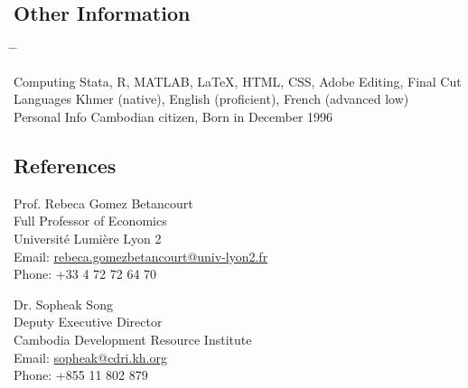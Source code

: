 \documentclass[10pt,a4paper]{article}
\newcommand{\tabbedblock}[1]{

	\begin{tabbing}
		\hspace{3cm} \= \hspace{4cm} \= \kill
		#1
	\end{tabbing}
}
\begin{document}
\subsection*{Other Information}

\tabbedblock{
	Computing \> Stata, R, MATLAB, \LaTeX, HTML, CSS,  Adobe Editing, Final Cut\\
	
	Languages \> Khmer (native), English (proficient), French (advanced low)\\
	
	Personal Info \> Cambodian citizen, Born in December 1996
}


\subsection*{References}		

\parbox{0.5\textwidth}{ %
	Prof. Rebeca Gomez Betancourt\\ 
	Full Professor of Economics\\ 
	Université Lumière Lyon 2\\
	Email: \href{mailto: Phone: rebeca.gomezbetancourt@univ-lyon2.fr}{rebeca.gomezbetancourt@univ-lyon2.fr}\\
	Phone: +33 4 72 72 64 70
}
\hfill %
\parbox{0.5\textwidth}{ %
	Dr. Sopheak Song\\ 
	Deputy Executive Director \\
	Cambodia Development Resource Institute\\ 
	Email: \href{mailto: sopheak@cdri.kh.org}{sopheak@cdri.kh.org}\\
	Phone: +855 11 802 879
}

\end{document}
